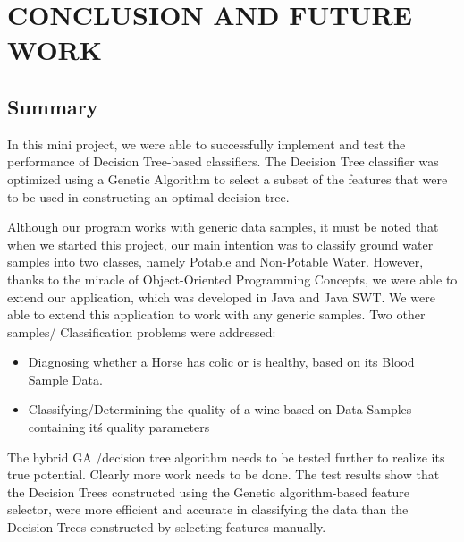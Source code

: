 \documentclass[12pt]{report}
\begin{document}
\pagestyle{fancy}
\chead{}
\rfoot{\small{\thepage}}
\renewcommand{\headrulewidth}{0.4pt}
\renewcommand{\footrulewidth}{0.4pt}
\chapter{CONCLUSION AND FUTURE WORK}

\section{Summary}
In this mini project, we were able to successfully implement and test the performance of Decision Tree-based classifiers. The Decision Tree classifier was optimized using a Genetic Algorithm to select a subset of the features that were to be used in constructing an optimal decision tree.


Although our program works with generic data samples, it must be noted that when we started this project, our main intention was to classify ground water samples into two classes, namely Potable and Non-Potable Water. However, thanks to the miracle of Object-Oriented Programming Concepts, we were able to extend our application, which was developed in Java and Java SWT. We were able to extend this application to work with any generic samples. Two other samples/ Classification problems were addressed:
\begin{itemize}
\item{Diagnosing whether a Horse has colic or is healthy, based on its Blood Sample Data.}
\item{Classifying/Determining the quality of a wine based on Data Samples containing it\'s quality parameters} 
\end{itemize} 

The hybrid GA /decision tree algorithm needs to be tested
further to realize its true potential. Clearly more work needs to be done. 
The test results show that the Decision Trees constructed using the Genetic algorithm-based feature selector, were more efficient and accurate in classifying the data than the Decision Trees constructed by selecting features manually.
\end{document}
